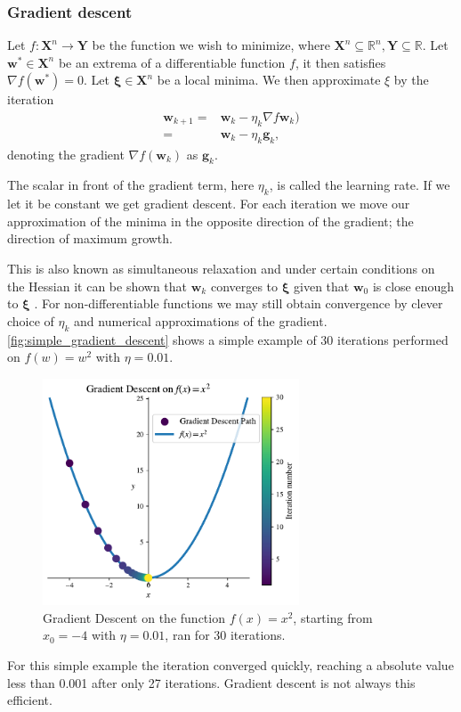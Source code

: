 \documentclass{article}
\theoremstyle{definition}
\begin{document}
\subsubsection{Gradient descent}
Let  $f: \mathbf{X}^n \rightarrow \mathbf{Y}$ be the function we wish to minimize, where $ \mathbf{X}^n \subseteq \mathbb{R}^n, \mathbf{Y}\subseteq \mathbb{R}$. Let $\boldsymbol{w}^* \in \mathbf{X}^n$ be an extrema of a differentiable function $f$, it then satisfies $\nabla f(\boldsymbol{w}^*) = 0$. Let $\boldsymbol{\xi} \in \mathbf{X}^n$ be a local minima. We then approximate $\xi$ by the iteration
\begin{equation}
\begin{aligned} 
    \boldsymbol{w}_{k+1} =& \boldsymbol{w}_k - \eta_k \nabla  f \boldsymbol{w}_k) \\
    =& \boldsymbol{w}_k - \eta_k  \boldsymbol{g}_k,
\end{aligned}
\label{eq:gradient_descent}
\end{equation}
denoting the gradient $\nabla f(\boldsymbol{w}_k)$ as $\boldsymbol{g}_k$.

The scalar in front of the gradient term, here $\eta_k$, is called the learning rate. If we let it be constant we get gradient descent. For each iteration we move our approximation of the minima in the opposite direction of the gradient; the direction of maximum growth. 

This is also known as simultaneous relaxation and under certain conditions on the Hessian it can be shown that $\boldsymbol{w}_k$ converges to $\boldsymbol{\xi}$  given that $\boldsymbol{w}_0$ is close enough to $\boldsymbol{\xi}$ \parencite[p.~117--118]{introNumeric}. For non-differentiable functions we may still obtain convergence by clever choice of $\eta_k$ and numerical approximations of the gradient. \autoref{fig:simple_gradient_descent} shows a simple example of 30 iterations performed on $f(w) = w^2$ with $\eta = 0.01$.

\begin{figure}[H]
    \centering
    \includegraphics[width=0.68\textwidth]{figures/simple_gradient_descent_x^2.pdf}
    \caption{Gradient Descent on the function $f(x)=x^2$, starting from $x_0 = -4$ with $\eta = 0.01$, ran for 30 iterations.}
    \label{fig:simple_gradient_descent}
\end{figure}
For this simple example the iteration converged quickly, reaching a absolute value less than 0.001 after only 27 iterations. Gradient descent is not always this efficient. 
\end{document}
